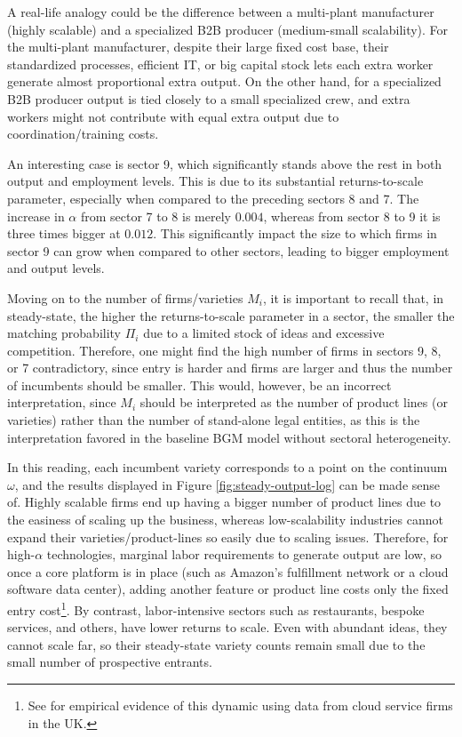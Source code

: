 \documentclass[a4paper,12pt]{article} %
\numberwithin{equation}{section} %
\numberwithin{figure}{section}
\numberwithin{table}{section}
\begin{document}
A real-life analogy could be the difference between a multi-plant manufacturer (highly scalable) and a specialized B2B producer 
(medium-small scalability). For the multi-plant manufacturer, despite their large fixed cost base, their standardized processes, efficient IT, 
or big capital stock lets each extra worker generate almost proportional extra output. On the other hand, for a specialized B2B producer output
is tied closely to a small specialized crew, and extra workers might not contribute with equal extra output due to coordination/training costs.

An interesting case is sector 9, which significantly stands above the rest in both output and employment levels. This is due to its substantial
returns-to-scale parameter, especially when compared to the preceding sectors 8 and 7. The increase in $\alpha$ from sector 7 to 8 
is merely $0.004$, whereas from sector 8 to 9 it is three times bigger at $0.012$. This significantly impact the size to which firms in 
sector 9 can grow when compared to other sectors, leading to bigger employment and output levels.

Moving on to the number of firms/varieties $M_i$, it is important to recall that, in steady-state, the higher the returns-to-scale parameter
in a sector, the smaller the matching probability $\Pi_i$ due to a limited stock of ideas and excessive competition. Therefore, one might find
the high number of firms in sectors 9, 8, or 7 contradictory, since entry is harder and firms are larger and thus the number of incumbents should
be smaller. This would, however, be an incorrect interpretation, since $M_i$ should be interpreted as the number of product lines (or varieties) 
rather than the number of stand-alone legal entities, as this is the interpretation favored in the baseline BGM model without 
sectoral heterogeneity. 

In this reading, each incumbent variety corresponds to a point on the continuum $\omega$, and the results displayed in 
Figure \ref{fig:steady-output-log} can be made sense of. Highly scalable firms end up having a bigger number of product lines due to the
easiness of scaling up the business, whereas low-scalability industries cannot expand their varieties/product-lines so easily due 
to scaling issues. Therefore, for high-$\alpha$ technologies, marginal labor requirements to generate output are low, so once a 
core platform is in place (such as Amazon's fulfillment network or a cloud software data center), adding another feature or product line costs
only the fixed entry cost\footnote{See \textcite{destefano2023cloud} for empirical evidence of this dynamic using data from cloud 
service firms in the UK.}.
 By contrast, labor-intensive sectors such as restaurants, bespoke services, and others, have lower returns to scale. Even with abundant ideas,
they cannot scale far, so their steady-state variety counts remain small due to the small number of prospective entrants.
\end{document}
